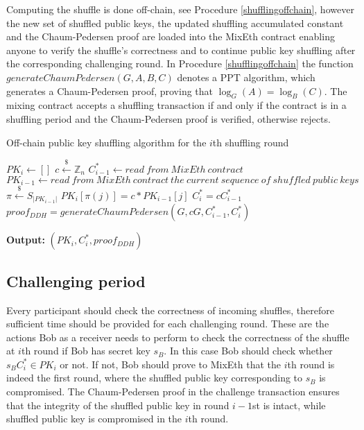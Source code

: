 \documentclass[a4paper,UKenglish,cleveref, autoref]{oasics-v2019}
\begin{document}
Computing the shuffle is done off-chain, see Procedure \ref{shufflingoffchain}, however the new set of shuffled public keys, the updated shuffling accumulated constant and the Chaum-Pedersen proof are loaded into the MixEth contract enabling anyone to verify the shuffle's correctness and to continue public key shuffling after the corresponding challenging round. In Procedure \ref{shufflingoffchain} the function $generateChaumPedersen(G,A,B,C)$ denotes a PPT algorithm, which generates a Chaum-Pedersen proof, proving that $\log_{G}(A)=\log_{B}(C)$.  The mixing contract accepts a shuffling transaction if and only if the contract is in a shuffling period and the Chaum-Pedersen proof is verified, otherwise rejects.

\begin{algorithm}
	\caption{Off-chain public key shuffling algorithm for the $i$th shuffling round}\label{shufflingoffchain}
	\begin{algorithmic}[1]
		\State $PK_{i} \gets []$
		\State $c\stackrel{\$}{\leftarrow}\mathbb{Z}_n$
		\State $C^{*}_{i-1}\leftarrow read\ from\ MixEth\ contract$
		\State $PK_{i-1}\leftarrow read\ from\ MixEth\ contract\ the\ current\ sequence\ of\ shuffled\ public\ keys$
		\State $\pi\stackrel{\$}{\leftarrow}S_{|PK_{i-1}|}$ 
		\State $PK_{i}[\pi(j)]=c*PK_{i-1}[j]$ 
		\EndFor
		\State $C^{*}_{i}=cC^{*}_{i-1}$
		\State $proof_{DDH}=generateChaumPedersen(G,cG,C^{*}_{i-1},C^{*}_{i})$
		
		\hspace*{\algorithmicindent} \textbf{Output:} $(PK_{i},C^{*}_{i},proof_{DDH})$ 
	\end{algorithmic}   
\end{algorithm}
\subsection{Challenging period}
Every participant should check the correctness of incoming shuffles, therefore sufficient time should be provided for each challenging round. These are the actions Bob as a receiver needs to perform to check the correctness of the shuffle at $i$th round if Bob has secret key $s_{B}$. In this case Bob should check whether $s_{B}C^{*}_{i} \in PK_{i}$ or not. If not, Bob should prove to MixEth that the $i$th round is indeed the first round, where the shuffled public key corresponding to $s_{B}$ is compromised. The Chaum-Pedersen proof in the challenge transaction ensures that the integrity of the shuffled public key in round $i-1$st is intact, while shuffled public key is compromised in the $i$th round.   
\end{document}

